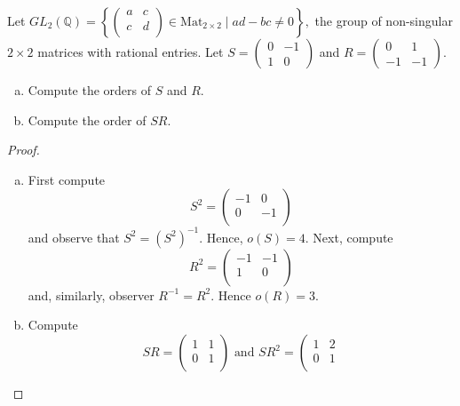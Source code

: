 \documentclass[10pt]{amsart}
\begin{document}
\begin{thm}
  Let $\displaystyle{GL_2(\mathbb{Q}) = \left\{ \left(
  \begin{array}{cc}
    a & c\\
    c & d\\
    \end{array}
  \right) \in \text{Mat}_{2\times 2}\mid ad - bc \not = 0\right\}},$ the group of non-singular $2 \times 2$ matrices with rational entries.  Let $S = \displaystyle{\left(
    \begin{array}{cc}
      0 & -1\\
      1 & 0
    \end{array}
    \right)}$ and $R = \displaystyle{\left(    
    \begin{array}{cc}
      0 & 1\\
      -1 & -1
    \end{array}\right)}$.
  \begin{enumerate}[(a)]
    \item
      Compute the orders of $S$ and $R$.
    \item 
      Compute the order of $SR$.
  \end{enumerate}
  \begin{proof}
    \begin{enumerate}[(a)]
    \item
      First compute 
      $$S^2 = \left(\begin{array}{cc}
        -1 & 0\\
        0 & -1\\
        \end{array}\right)$$
      and observe that $S^2 = (S^2)^{-1}$.  Hence, $o(S) = 4$.
      Next, compute
      $$R^2 = \left(\begin{array}{cc}
        -1 & -1\\
        1 & 0 \\
        \end{array}\right)$$
      and, similarly, observer $R^{-1} = R^2.$  Hence $o(R) = 3$.
    \item
      Compute 
      $$SR = \left(\begin{array}{cc}
        1 & 1\\
        0 & 1 \\
        \end{array}\right)
      \text{ and }
      SR^2 = \left(\begin{array}{cc}
        1 & 2\\
        0 & 1 \\

\end{array}$$
\end{enumerate}
\end{proof}
\end{thm}
\end{document}
